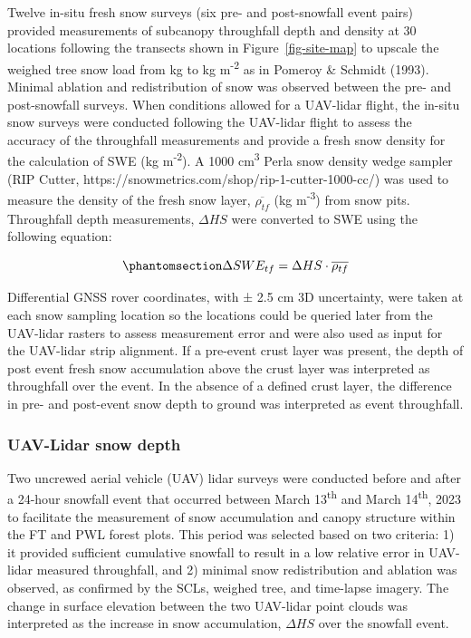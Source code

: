 \documentclass[
  letterpaper,
  DIV=11,
  numbers=noendperiod]{scrartcl}
\begin{document}
Twelve in-situ fresh snow surveys (six pre- and post-snowfall event
pairs) provided measurements of subcanopy throughfall depth and density
at 30 locations following the transects shown in
Figure~\ref{fig-site-map} to upscale the weighed tree snow load from kg
to kg m\textsuperscript{-2} as in Pomeroy \& Schmidt (1993). Minimal
ablation and redistribution of snow was observed between the pre- and
post-snowfall surveys. When conditions allowed for a UAV-lidar flight,
the in-situ snow surveys were conducted following the UAV-lidar flight
to assess the accuracy of the throughfall measurements and provide a
fresh snow density for the calculation of SWE (kg
m\textsuperscript{-2}). A 1000 cm\textsuperscript{3} Perla snow density
wedge sampler (RIP Cutter,
https://snowmetrics.com/shop/rip-1-cutter-1000-cc/) was used to measure
the density of the fresh snow layer, \(\overline{\rho_{tf}}\) (kg
m\textsuperscript{-3}) from snow pits. Throughfall depth measurements,
\(\Delta HS\) were converted to SWE using the following equation:

\begin{equation}\phantomsection\label{eq-swe-tf}{
\Delta SWE_{tf} = \Delta HS \cdot \overline{\rho_{tf}}
}\end{equation}

Differential GNSS rover coordinates, with ± 2.5 cm 3D uncertainty, were
taken at each snow sampling location so the locations could be queried
later from the UAV-lidar rasters to assess measurement error and were
also used as input for the UAV-lidar strip alignment. If a pre-event
crust layer was present, the depth of post event fresh snow accumulation
above the crust layer was interpreted as throughfall over the event. In
the absence of a defined crust layer, the difference in pre- and
post-event snow depth to ground was interpreted as event throughfall.

\subsubsection{UAV-Lidar snow depth}\label{uav-lidar-snow-depth}

Two uncrewed aerial vehicle (UAV) lidar surveys were conducted before
and after a 24-hour snowfall event that occurred between March
13\textsuperscript{th} and March 14\textsuperscript{th}, 2023 to
facilitate the measurement of snow accumulation and canopy structure
within the FT and PWL forest plots. This period was selected based on
two criteria: 1) it provided sufficient cumulative snowfall to result in
a low relative error in UAV-lidar measured throughfall, and 2) minimal
snow redistribution and ablation was observed, as confirmed by the SCLs,
weighed tree, and time-lapse imagery. The change in surface elevation
between the two UAV-lidar point clouds was interpreted as the increase
in snow accumulation, \(\Delta HS\) over the snowfall event.
\end{document}
